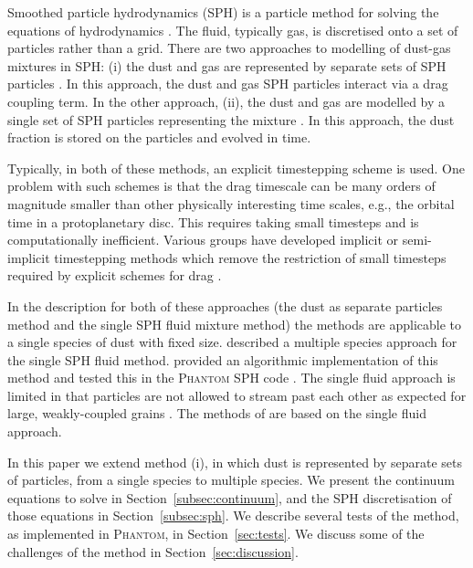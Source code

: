 \documentclass[fleqn,usenatbib]{mnras}
\begin{document}
Smoothed particle hydrodynamics (SPH) is a particle method for solving the
equations of hydrodynamics \citep{Monaghan1992ARA&A..30..543M,
Monaghan2005RPPh...68.1703M, Price2012JCoPh.231..759P}. The fluid, typically
gas, is discretised onto a set of particles rather than a grid. There are two
approaches to modelling of dust-gas mixtures in SPH: (i) the dust and gas are
represented by separate sets of SPH particles
\citep{Monaghan1995CoPhC..87..225M, Laibe2012MNRAS.420.2345L,
Laibe2012MNRAS.420.2365L}. In this approach, the dust and gas SPH particles
interact via a drag coupling term. In the other approach, (ii), the dust and gas
are modelled by a single set of SPH particles representing the mixture
\citep{Laibe2014MNRAS.444.1940L, Laibe2014MNRAS.440.2147L,
Laibe2014MNRAS.440.2136L, Price2015MNRAS.451..813P,
Ballabio2018MNRAS.477.2766B}. In this approach, the dust fraction is stored on
the particles and evolved in time.

Typically, in both of these methods, an explicit timestepping scheme is used.
One problem with such schemes is that the drag timescale can be many orders of
magnitude smaller than other physically interesting time scales, e.g., the
orbital time in a protoplanetary disc. This requires taking small timesteps and
is computationally inefficient. Various groups have developed implicit or
semi-implicit timestepping methods which remove the restriction of small
timesteps required by explicit schemes for drag
\citep{Monaghan1997JCoPh.138..801M, Laibe2012MNRAS.420.2365L,
Loren-Aguilar2014MNRAS.443..927L, Loren-Aguilar2015MNRAS.454.4114L,
Stoyanovskaya2018A&C....25...25S}.

In the description for both of these approaches (the dust as separate particles
method and the single SPH fluid mixture method) the methods are applicable to a
single species of dust with fixed size. \citet{Laibe2014MNRAS.444.1940L}
described a multiple species approach for the single SPH fluid method.
\citet{Hutchison2018MNRAS.476.2186H} provided an algorithmic implementation of
this method and tested this in the \textsc{Phantom} SPH code
\citep{Price2018PASA...35...31P}. The single fluid approach is limited in that
particles are not allowed to stream past each other as expected for large,
weakly-coupled grains \citep{Laibe2014MNRAS.440.2147L}. The methods of
\citet{Benitez-Llambay2019ApJS..241...25B, Lebreuilly2019A&A...626A..96L,
Li2019ApJ...878...39L} are based on the single fluid approach.

In this paper we extend method (i), in which dust is represented by separate
sets of particles, from a single species to multiple species. We present the
continuum equations to solve in Section~\ref{subsec:continuum}, and the SPH
discretisation of those equations in Section~\ref{subsec:sph}. We describe
several tests of the method, as implemented in \textsc{Phantom}, in
Section~\ref{sec:tests}. We discuss some of the challenges of the method in
Section~\ref{sec:discussion}.
\end{document}

